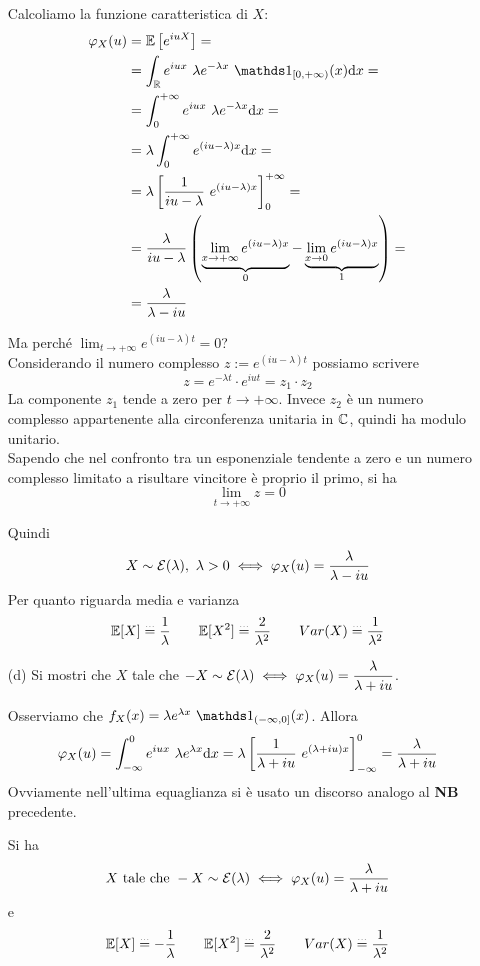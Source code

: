 \begin{enumerate}
Calcoliamo la funzione caratteristica di $X$:
\begin{gather*}
\begin{aligned}
\varphi_X(u)&=\EE\left[e^{iuX}  \right]=\\
&=\int_\RR e^{iux}\ \lambda e^{-\lambda x}\ \Ind_{[0,+\infty)}(x)\dx=\\
&=\int_0^{+\infty}e^{iux}\ \lambda e^{-\lambda x}\dx=\\
&=\lambda\int_0^{+\infty}e^{(iu-\lambda)x}\dx=\\
&=\lambda\left[\frac{1}{iu-\lambda}\ e^{(iu-\lambda)x}   \right]_0^{+\infty}=\\
&=\displaystyle\frac{\lambda}{iu-\lambda}\left( \underbrace{\lim_{x\to+\infty}e^{(iu-\lambda)x}}_{0}-\underbrace{\lim_{x\to 0}e^{(iu-\lambda)x}}_{1}   \right)=\\
&=\frac{\lambda}{\lambda-iu}
\end{aligned}
\end{gather*}
\begin{nb}
Ma perché $\displaystyle\lim_{t\to+\infty}e^{(iu-\lambda)t}=0$? \\
Considerando il numero complesso $z:=e^{(iu-\lambda)t}$ possiamo scrivere
\[
z=e^{-\lambda t}\cdot e^{iut}=z_1\cdot z_2
\]
La componente $z_1$ tende a zero per $t\to+\infty$. Invece $z_2$ è un numero complesso appartenente alla circonferenza unitaria in $\mathbb{C}$, quindi ha modulo unitario. \\
Sapendo che nel confronto tra un esponenziale tendente a zero e un numero complesso limitato a risultare vincitore è proprio il primo, si ha
\[
\displaystyle\lim_{t\to+\infty}z=0
\]
\end{nb}
Quindi
\[
X\sim\Ec(\lambda),\ \lambda>0\iff\varphi_X(u)=\frac{\lambda}{\lambda-iu}
\]
Per quanto riguarda media e varianza
\[
\mathbb{E}[X]\overset{\underset{\dots}{}}{=}\frac{1}{\lambda} \qquad \mathbb{E}[X^2]\overset{\underset{\dots}{}}{=}\frac{2}{\lambda^2}\qquad Var(X)\overset{\underset{\dots}{}}{=}\frac{1}{\lambda^2}
\]

\item [(d)] Si mostri che $X$ tale che $-X\sim\mathcal{E}(\lambda)\iff\varphi_X(u)=\dfrac{\lambda}{\lambda+iu}$.

Osserviamo che $f_X(x)=\lambda e^{\lambda x}\ \Ind_{(-\infty,0]}(x)$. Allora
\[
\varphi_X(u)=\int_{-\infty}^0e^{iux}\ \lambda e^{\lambda x}\dx=\lambda\left[\frac{1}{\lambda+iu}\ e^{(\lambda+iu)x}   \right]_{-\infty}^{0}=\frac{\lambda}{\lambda+iu}
\]
Ovviamente nell'ultima equaglianza si è usato un discorso analogo al \textbf{NB} precedente.

Si ha
\[
X\text{ tale che }-X\sim\mathcal{E}(\lambda)\iff\varphi_X(u)=\dfrac{\lambda}{\lambda+iu}
\]
e
\[
\mathbb{E}[X]\overset{\underset{\dots}{}}{=}-\frac{1}{\lambda} \qquad \mathbb{E}[X^2]\overset{\underset{\dots}{}}{=}\frac{2}{\lambda^2}\qquad Var(X)\overset{\underset{\dots}{}}{=}\frac{1}{\lambda^2}
\]
\end{enumerate}

